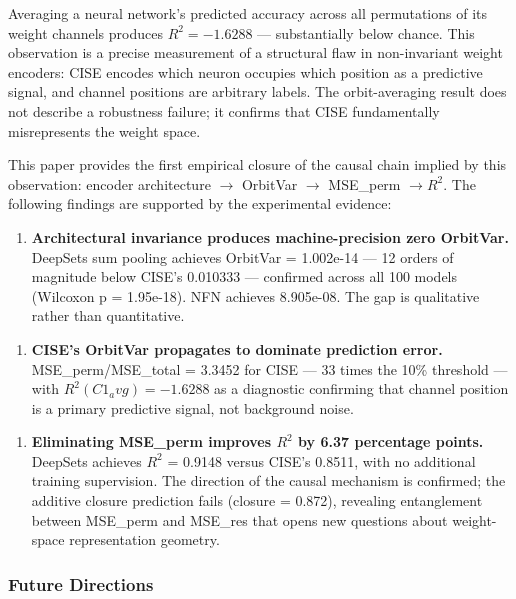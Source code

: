
Averaging a neural network's predicted accuracy across all permutations of its weight channels produces $R^2 = -1.6288$ --- substantially below chance. This observation is a precise measurement of a structural flaw in non-invariant weight encoders: CISE encodes which neuron occupies which position as a predictive signal, and channel positions are arbitrary labels. The orbit-averaging result does not describe a robustness failure; it confirms that CISE fundamentally misrepresents the weight space.

This paper provides the first empirical closure of the causal chain implied by this observation: encoder architecture $\rightarrow$ OrbitVar $\rightarrow$ MSE\_perm $\rightarrow R^2$. The following findings are supported by the experimental evidence:

\begin{enumerate}
\item \textbf{Architectural invariance produces machine-precision zero OrbitVar.} DeepSets sum pooling achieves OrbitVar = 1.002e-14 --- 12 orders of magnitude below CISE's 0.010333 --- confirmed across all 100 models (Wilcoxon p = 1.95e-18). NFN achieves 8.905e-08. The gap is qualitative rather than quantitative.
\end{enumerate}

\begin{enumerate}
\item \textbf{CISE's OrbitVar propagates to dominate prediction error.} MSE\_perm/MSE\_total = 3.3452 for CISE --- 33 times the 10\% threshold --- with $R^{2}(C1_avg) = -1.6288$ as a diagnostic confirming that channel position is a primary predictive signal, not background noise.
\end{enumerate}

\begin{enumerate}
\item \textbf{Eliminating MSE\_perm improves $R^2$ by 6.37 percentage points.} DeepSets achieves $R^2$ = 0.9148 versus CISE's 0.8511, with no additional training supervision. The direction of the causal mechanism is confirmed; the additive closure prediction fails (closure = 0.872), revealing entanglement between MSE\_perm and MSE\_res that opens new questions about weight-space representation geometry.
\end{enumerate}

\subsubsection{Future Directions}

